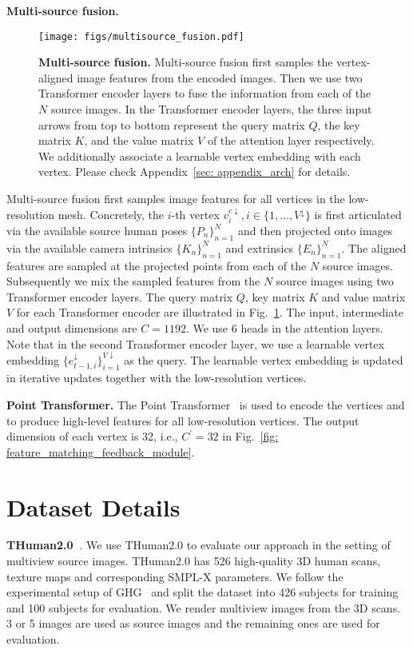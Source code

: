 \textbf{Multi-source fusion.}
\begin{figure}[t]
    \centering
    \texttt{[image: figs/multisource\_fusion.pdf]}
    \caption{\textbf{Multi-source fusion.} Multi-source fusion first samples the vertex-aligned image features from the encoded images. Then we use two Transformer encoder layers to fuse the information from each of the $N$ source images. In the Transformer encoder layers, the three input arrows from top to bottom represent the query matrix $Q$, the key matrix $K$, and the value matrix $V$ of the attention layer respectively. We additionally associate a learnable vertex embedding with each vertex. Please check Appendix~\ref{sec: appendix_arch}  for details.}
    \label{fig: multisource_fusion}
\end{figure}
Multi-source fusion first samples  image features for all vertices in the low-resolution mesh. Concretely, the $i$-th vertex $v_i^{c\downarrow}, i\in\{1, \dots, V^\downarrow\}$ is first articulated via the available source human poses $\{P_n\}_{n=1}^N$ and then projected  onto  images via the available camera intrinsics $\{K_n\}_{n=1}^N$ and extrinsics $\{E_n\}_{n=1}^N$. The aligned features are sampled at the projected points from each of the $N$ source images. Subsequently we mix the sampled features from the $N$ source images using two Transformer encoder layers. The query matrix $Q$, key matrix $K$ and value matrix $V$ for each Transformer encoder are illustrated in Fig.~\ref{fig: multisource_fusion}. 
The input, intermediate and output dimensions are $C=1192$. We use 6 heads in the attention layers.
Note that in the second Transformer encoder layer, we use a learnable vertex embedding $\{e_{t-1, i}^\downarrow\}_{i=1}^{V\downarrow}$ as the query. The learnable vertex embedding is updated in iterative updates together with the low-resolution vertices. %

\textbf{Point Transformer.} The Point Transformer~\citep{zhao2021point} is used to encode the vertices and to produce high-level features for all low-resolution vertices. The output dimension of each vertex is 32, i.e., $C^\prime=32$ in Fig.~\ref{fig: feature_matching_feedback_module}.

\section{Dataset Details}
\label{sec: appendix_dataset}
\textbf{THuman2.0~\citep{tao2021function4d}}. We use THuman2.0 to evaluate our approach in the setting of multiview source images. THuman2.0 has 526 high-quality 3D human scans, texture maps and corresponding SMPL-X parameters. We follow the experimental setup of GHG~\citep{kwon2024ghg} and split the dataset into 426 subjects for training and 100 subjects for evaluation. We render multiview images from the 3D scans. 3 or 5 images are used as source images and the remaining ones are used for evaluation. 

